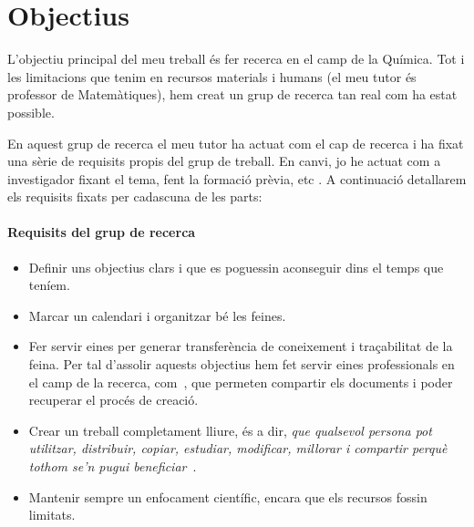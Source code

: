 \chapter{Objectius}

L'objectiu principal del meu treball és fer recerca en el camp de la Química. Tot i les limitacions que tenim en recursos materials i humans (el meu tutor és professor de Matemàtiques), hem creat un grup de recerca tan real com ha estat possible.

En aquest grup de recerca el meu tutor ha actuat com el cap de recerca i ha fixat una sèrie de requisits propis del grup de treball. En canvi, jo he actuat com a investigador fixant el tema, fent la formació prèvia, etc .
A continuació detallarem els requisits fixats per cadascuna de les parts:

\subsubsection*{Requisits del grup de recerca}
\begin{itemize}
    \item Definir uns objectius clars i que es poguessin aconseguir dins el temps que teníem.
    \item Marcar un calendari i organitzar bé les feines.
    \item Fer servir eines per generar transferència de coneixement i traçabilitat de la feina. Per tal d'assolir aquests objectius hem fet servir eines professionals en el camp de la recerca, com~, que permeten compartir els documents i poder recuperar el procés de creació.
    \item Crear un treball completament lliure, és a dir, \textit{que qualsevol persona pot utilitzar, distribuir, copiar, estudiar, modificar, millorar i compartir perquè tothom se'n pugui beneficiar}~\cite{programariLliure}.
    \item Mantenir sempre un enfocament científic, encara que els recursos fossin limitats.
\end{itemize}

